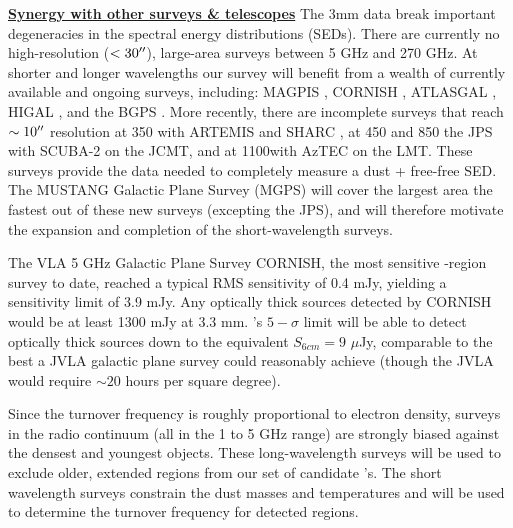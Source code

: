 \documentclass[11pt,preprint]{aastex_nofoot}
\begin{document}

\indent\underline{\textbf{\helv Synergy with other surveys \& telescopes}} 
The 3mm data break important degeneracies in the spectral energy distributions
(SEDs). There are currently no high-resolution ($<30\mbox{$^{\prime\prime}$}$), large-area
surveys between 5 GHz and 270 GHz.  At shorter and longer wavelengths our
survey will benefit from a wealth of currently available and ongoing surveys,
including: MAGPIS \citep{Helfand2006a}, CORNISH \citep{Hoare2012a}, ATLASGAL
\citep{Schuller2009a},  HIGAL \citep{Molinari2010a}, and the BGPS
\citep[][]{Aguirre2011a,Ginsburg2013a}.  More recently, there are incomplete
surveys that reach $\sim10\mbox{$^{\prime\prime}$}$ resolution at 350 \um with ARTEMIS and SHARC
\citep[e.g.][]{Lin2016a}, at 450 and 850 \um the JPS with SCUBA-2 on the JCMT,
and at 1100\um with AzTEC on the LMT. These surveys provide the data needed to
completely measure a dust + free-free SED.  The MUSTANG Galactic Plane Survey
(MGPS) will cover the largest area the fastest out of these new surveys
(excepting the JPS), and will therefore motivate the expansion and completion
of the short-wavelength surveys.

The VLA 5 GHz Galactic Plane Survey CORNISH, the most sensitive \uchii-region
survey to date, reached a typical RMS sensitivity of 0.4 mJy, yielding a
sensitivity limit of 3.9 mJy.  Any optically thick sources detected by CORNISH
would be at least 1300 mJy at 3.3 mm.  \MUSTANG’s $5-\sigma$ limit will be able
to detect optically thick sources down to the equivalent $S_{6cm} = 9$ $\mu$Jy,
comparable to the best a JVLA galactic plane survey could reasonably achieve
(though the JVLA would require $\sim20$ hours per square degree).


Since the turnover frequency is roughly proportional to electron density,
surveys in the radio continuum (all in the 1 to 5 GHz range) are strongly
biased against the densest and youngest objects.  These long-wavelength surveys
will be used to exclude older, extended \uchii regions from our set of
candidate \hchii's.  The short wavelength surveys constrain the dust masses and
temperatures and will be used to determine the turnover frequency for detected
\hchii regions.
\end{document}
